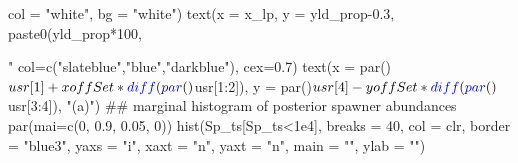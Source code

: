 \documentclass[11pt,]{article}
\newenvironment{Shaded}{}{}
\newcommand{\CommentTok}[1]{\textcolor[rgb]{0.00,0.50,0.00}{#1}}
\newcommand{\DataTypeTok}[1]{#1}
\newcommand{\DecValTok}[1]{#1}
\newcommand{\FloatTok}[1]{#1}
\newcommand{\KeywordTok}[1]{\textcolor[rgb]{0.00,0.00,1.00}{#1}}
\newcommand{\NormalTok}[1]{#1}
\newcommand{\OperatorTok}[1]{#1}
\newcommand{\StringTok}[1]{\textcolor[rgb]{0.00,0.50,0.50}{#1}}
\begin{document}
\begin{Shaded}
\begin{Highlighting}[]
{       \DataTypeTok{col =} \StringTok{"white"}\NormalTok{, }\DataTypeTok{bg =} \StringTok{"white"}\NormalTok{)}
\KeywordTok{text}\NormalTok{(}\DataTypeTok{x =}\NormalTok{ x_lp, }\DataTypeTok{y =}\NormalTok{ yld_prop}\FloatTok{-0.3}\NormalTok{, }\KeywordTok{paste0}\NormalTok{(yld_prop}\OperatorTok{*}\DecValTok{100}\NormalTok{, }\StringTok{"%
     \DataTypeTok{col=}\KeywordTok{c}\NormalTok{(}\StringTok{"slateblue"}\NormalTok{,}\StringTok{"blue"}\NormalTok{,}\StringTok{"darkblue"}\NormalTok{), }\DataTypeTok{cex=}\FloatTok{0.7}\NormalTok{)}
\KeywordTok{text}\NormalTok{(}\DataTypeTok{x =} \KeywordTok{par}\NormalTok{()}\OperatorTok{$}\NormalTok{usr[}\DecValTok{1}\NormalTok{] }\OperatorTok{+}\StringTok{ }\NormalTok{xoffSet }\OperatorTok{*}\StringTok{ }\KeywordTok{diff}\NormalTok{(}\KeywordTok{par}\NormalTok{()}\OperatorTok{$}\NormalTok{usr[}\DecValTok{1}\OperatorTok{:}\DecValTok{2}\NormalTok{]),}
     \DataTypeTok{y =} \KeywordTok{par}\NormalTok{()}\OperatorTok{$}\NormalTok{usr[}\DecValTok{4}\NormalTok{] }\OperatorTok{-}\StringTok{ }\NormalTok{yoffSet }\OperatorTok{*}\StringTok{ }\KeywordTok{diff}\NormalTok{(}\KeywordTok{par}\NormalTok{()}\OperatorTok{$}\NormalTok{usr[}\DecValTok{3}\OperatorTok{:}\DecValTok{4}\NormalTok{]),}
     \StringTok{"(a)"}\NormalTok{)}
\CommentTok{## marginal histogram of posterior spawner abundances}
\KeywordTok{par}\NormalTok{(}\DataTypeTok{mai=}\KeywordTok{c}\NormalTok{(}\DecValTok{0}\NormalTok{, }\FloatTok{0.9}\NormalTok{, }\FloatTok{0.05}\NormalTok{, }\DecValTok{0}\NormalTok{))}
\KeywordTok{hist}\NormalTok{(Sp_ts[Sp_ts}\OperatorTok{<}\FloatTok{1e4}\NormalTok{], }\DataTypeTok{breaks =} \DecValTok{40}\NormalTok{,}
     \DataTypeTok{col =}\NormalTok{ clr, }\DataTypeTok{border =} \StringTok{"blue3"}\NormalTok{, }
     \DataTypeTok{yaxs =} \StringTok{"i"}\NormalTok{, }\DataTypeTok{xaxt =} \StringTok{"n"}\NormalTok{, }\DataTypeTok{yaxt =} \StringTok{"n"}\NormalTok{,}
     \DataTypeTok{main =} \StringTok{""}\NormalTok{, }\DataTypeTok{ylab =} \StringTok{""}\NormalTok{)}

}}
\end{Highlighting}
\end{Shaded}
\end{document}
